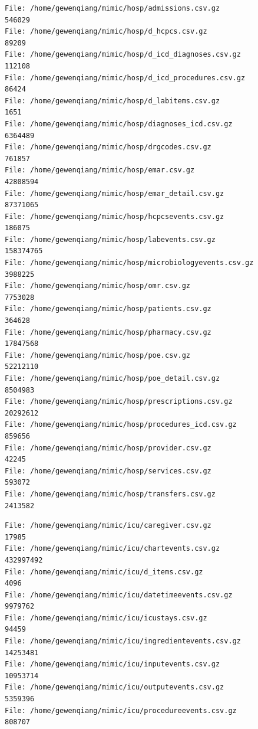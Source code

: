 \documentclass[
]{article}
\newenvironment{Shaded}{\begin{snugshade}}{\end{snugshade}}
\newcommand{\AttributeTok}[1]{\textcolor[rgb]{0.40,0.45,0.13}{#1}}
\newcommand{\BuiltInTok}[1]{\textcolor[rgb]{0.00,0.23,0.31}{#1}}
\newcommand{\ControlFlowTok}[1]{\textcolor[rgb]{0.00,0.23,0.31}{#1}}
\newcommand{\FunctionTok}[1]{\textcolor[rgb]{0.28,0.35,0.67}{#1}}
\newcommand{\KeywordTok}[1]{\textcolor[rgb]{0.00,0.23,0.31}{#1}}
\newcommand{\NormalTok}[1]{\textcolor[rgb]{0.00,0.23,0.31}{#1}}
\newcommand{\PreprocessorTok}[1]{\textcolor[rgb]{0.68,0.00,0.00}{#1}}
\newcommand{\StringTok}[1]{\textcolor[rgb]{0.13,0.47,0.30}{#1}}
\newcommand{\VariableTok}[1]{\textcolor[rgb]{0.07,0.07,0.07}{#1}}
\begin{document}
\begin{verbatim}
File: /home/gewenqiang/mimic/hosp/admissions.csv.gz
546029
File: /home/gewenqiang/mimic/hosp/d_hcpcs.csv.gz
89209
File: /home/gewenqiang/mimic/hosp/d_icd_diagnoses.csv.gz
112108
File: /home/gewenqiang/mimic/hosp/d_icd_procedures.csv.gz
86424
File: /home/gewenqiang/mimic/hosp/d_labitems.csv.gz
1651
File: /home/gewenqiang/mimic/hosp/diagnoses_icd.csv.gz
6364489
File: /home/gewenqiang/mimic/hosp/drgcodes.csv.gz
761857
File: /home/gewenqiang/mimic/hosp/emar.csv.gz
42808594
File: /home/gewenqiang/mimic/hosp/emar_detail.csv.gz
87371065
File: /home/gewenqiang/mimic/hosp/hcpcsevents.csv.gz
186075
File: /home/gewenqiang/mimic/hosp/labevents.csv.gz
158374765
File: /home/gewenqiang/mimic/hosp/microbiologyevents.csv.gz
3988225
File: /home/gewenqiang/mimic/hosp/omr.csv.gz
7753028
File: /home/gewenqiang/mimic/hosp/patients.csv.gz
364628
File: /home/gewenqiang/mimic/hosp/pharmacy.csv.gz
17847568
File: /home/gewenqiang/mimic/hosp/poe.csv.gz
52212110
File: /home/gewenqiang/mimic/hosp/poe_detail.csv.gz
8504983
File: /home/gewenqiang/mimic/hosp/prescriptions.csv.gz
20292612
File: /home/gewenqiang/mimic/hosp/procedures_icd.csv.gz
859656
File: /home/gewenqiang/mimic/hosp/provider.csv.gz
42245
File: /home/gewenqiang/mimic/hosp/services.csv.gz
593072
File: /home/gewenqiang/mimic/hosp/transfers.csv.gz
2413582
\end{verbatim}

\begin{Shaded}
\end{Shaded}

\begin{verbatim}
File: /home/gewenqiang/mimic/icu/caregiver.csv.gz
17985
File: /home/gewenqiang/mimic/icu/chartevents.csv.gz
432997492
File: /home/gewenqiang/mimic/icu/d_items.csv.gz
4096
File: /home/gewenqiang/mimic/icu/datetimeevents.csv.gz
9979762
File: /home/gewenqiang/mimic/icu/icustays.csv.gz
94459
File: /home/gewenqiang/mimic/icu/ingredientevents.csv.gz
14253481
File: /home/gewenqiang/mimic/icu/inputevents.csv.gz
10953714
File: /home/gewenqiang/mimic/icu/outputevents.csv.gz
5359396
File: /home/gewenqiang/mimic/icu/procedureevents.csv.gz
808707
\end{verbatim}
\end{document}
